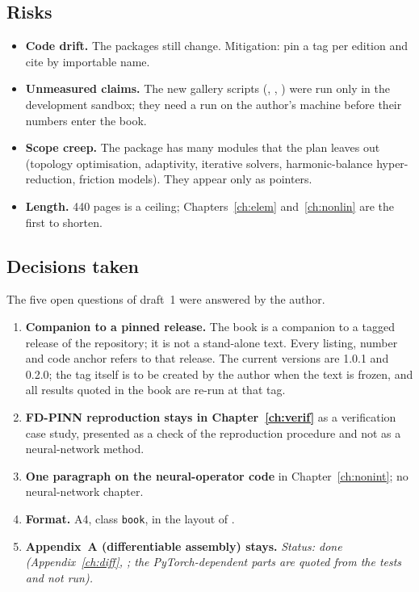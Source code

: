 \subsection{Risks}
\begin{itemize}
\item \textbf{Code drift.} The packages still change. Mitigation: pin a tag per edition and cite by importable name.
\item \textbf{Unmeasured claims.} The new gallery scripts (, , ) were run only in the development sandbox; they need a run on the author's machine before their numbers enter the book.
\item \textbf{Scope creep.} The package has many modules that the plan leaves out (topology optimisation, adaptivity, iterative solvers, harmonic-balance hyper-reduction, friction models). They appear only as pointers.
\item \textbf{Length.} 440 pages is a ceiling; Chapters~\ref{ch:elem} and~\ref{ch:nonlin} are the first to shorten.
\end{itemize}

\subsection{Decisions taken}
The five open questions of draft~1 were answered by the author.
\begin{enumerate}
\item \textbf{Companion to a pinned release.} The book is a companion to a tagged release of the repository; it is not a stand-alone text. Every listing, number and code anchor refers to that release. The current versions are \fea{} 1.0.1 and \rom{} 0.2.0; the tag itself is to be created by the author when the text is frozen, and all results quoted in the book are re-run at that tag.
\item \textbf{FD-PINN reproduction stays in Chapter~\ref{ch:verif}} as a verification case study, presented as a check of the reproduction procedure and not as a neural-network method.
\item \textbf{One paragraph on the neural-operator code} in Chapter~\ref{ch:nonint}; no neural-network chapter.
\item \textbf{Format.} A4, class \texttt{book}, in the layout of .
\item \textbf{Appendix~A (differentiable assembly) stays.} \emph{Status: done (Appendix~\ref{ch:diff}, ; the PyTorch-dependent parts are quoted from the tests and not run).}
\end{enumerate}

